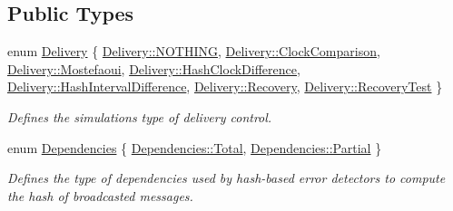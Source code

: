 \subsection*{Public Types}
\begin{DoxyCompactItemize}
\item 
enum \hyperlink{class_simulation_parameters_ae08444273809241f502aa422205f7307}{Delivery} \{ \newline
\hyperlink{class_simulation_parameters_ae08444273809241f502aa422205f7307a8697250efc73639dd2a6e7da243ac68b}{Delivery\+::\+N\+O\+T\+H\+I\+NG}, 
\hyperlink{class_simulation_parameters_ae08444273809241f502aa422205f7307a3ccf7e50009c796055e4814c7219f2df}{Delivery\+::\+Clock\+Comparison}, 
\hyperlink{class_simulation_parameters_ae08444273809241f502aa422205f7307a59feb63389b0898ec47a4ab58d1be6f6}{Delivery\+::\+Mostefaoui}, 
\hyperlink{class_simulation_parameters_ae08444273809241f502aa422205f7307a9a46ad9fb926b8b78ba9395f96aa6af0}{Delivery\+::\+Hash\+Clock\+Difference}, 
\newline
\hyperlink{class_simulation_parameters_ae08444273809241f502aa422205f7307ae3d02f7a43cb7e3e7d667a67f84c3e32}{Delivery\+::\+Hash\+Interval\+Difference}, 
\hyperlink{class_simulation_parameters_ae08444273809241f502aa422205f7307ad8afbc541b39d23648c823057cffe3a5}{Delivery\+::\+Recovery}, 
\hyperlink{class_simulation_parameters_ae08444273809241f502aa422205f7307a54bac2e6b76064db3dcf3d7c3a7b787b}{Delivery\+::\+Recovery\+Test}
 \}\begin{DoxyCompactList}\small\item\em Defines the simulation\textquotesingle{}s type of delivery control. \end{DoxyCompactList}
\item 
enum \hyperlink{class_simulation_parameters_afb3b6aaecd4b19ef1991c870c8402dff}{Dependencies} \{ \hyperlink{class_simulation_parameters_afb3b6aaecd4b19ef1991c870c8402dffa96b0141273eabab320119c467cdcaf17}{Dependencies\+::\+Total}, 
\hyperlink{class_simulation_parameters_afb3b6aaecd4b19ef1991c870c8402dffa44ffd38a6dea695cbe2b34efdcc6cf27}{Dependencies\+::\+Partial}
 \}\begin{DoxyCompactList}\small\item\em Defines the type of dependencies used by hash-\/based error detectors to compute the hash of broadcasted messages. \end{DoxyCompactList}
\end{DoxyCompactItemize}
